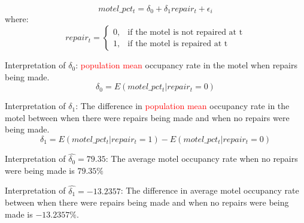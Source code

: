 \documentclass[11pt, xcolor=x11names,compress]{beamer}
\begin{document}
\begin{frame}[fragile,t]
\begin{equation*}
motel\_pct_t = \delta_0 + \delta_1 repair_t + \epsilon_i
\end{equation*}
where:
\begin{equation*}
 repair_t= \begin{cases} 0, & \mbox{if the motel is not repaired at t} \\ 1, & \mbox{if the motel is repaired at t}
\end{cases}  
\end{equation*}

\vspace{3mm}

Interpretation of $\delta_0$:  \textcolor{red}{population mean} occupancy rate in the motel when repairs being made.\\ 
\begin{equation*}
   \delta_0 = E(motel\_pct_t|repair_t = 0) 
\end{equation*}

Interpretation of $\delta_1$: The difference in \textcolor{red}{population mean} occupancy rate in the motel between when there were repairs being made and when no repairs were being made. 
\begin{equation*}
   \delta_1 = E(motel\_pct_t|repair_t = 1) - E(motel\_pct_t|repair_t = 0) 
\end{equation*}
\end{frame}

\begin{frame}[fragile,t]
Interpretation of $\hat{\delta_0} = 79.35$: The average motel occupancy rate when no repairs were being made is $79.35\%$

\vspace{3mm}

Interpretation of $\hat{\delta_1} = -13.2357$: The difference in average motel occupancy rate between when there were repairs being made and when no repairs were being made is $-13.2357\%$.

\end{frame}
\end{document}
